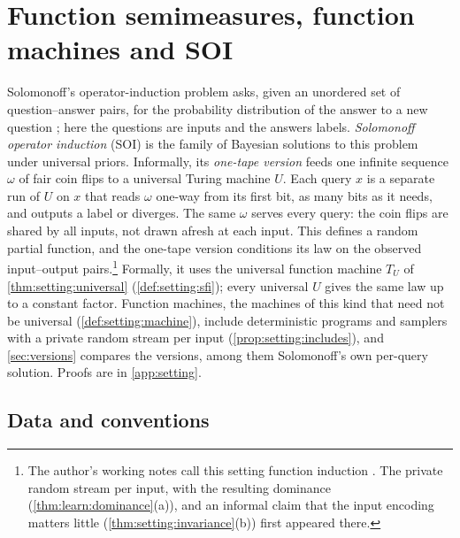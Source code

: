 \section{Function semimeasures, function machines and SOI}\label{sec:setting}

Solomonoff's operator-induction problem asks, given an unordered set of question--answer pairs, for the probability distribution of the answer to a new question \citep{solomonoff2008three}; here the questions are inputs and the answers labels. \emph{Solomonoff operator induction} (SOI) is the family of Bayesian solutions to this problem under universal priors. Informally, its \emph{one-tape version} feeds one infinite sequence $\omega$ of fair coin flips to a universal Turing machine $U$. Each query $x$ is a separate run of $U$ on $x$ that reads $\omega$ one-way from its first bit, as many bits as it needs, and outputs a label or diverges. The same $\omega$ serves every query: the coin flips are shared by all inputs, not drawn afresh at each input. This defines a random partial function, and the one-tape version conditions its law on the observed input--output pairs.\footnote{The author's working notes call this setting function induction \citep{hanni2026notes}. The private random stream per input, with the resulting dominance (\cref{thm:learn:dominance}(a)), and an informal claim that the input encoding matters little (\cref{thm:setting:invariance}(b)) first appeared there.} Formally, it uses the universal function machine $T_U$ of \cref{thm:setting:universal} (\cref{def:setting:sfi}); every universal $U$ gives the same law up to a constant factor. Function machines, the machines of this kind that need not be universal (\cref{def:setting:machine}), include deterministic programs and samplers with a private random stream per input (\cref{prop:setting:includes}), and \cref{sec:versions} compares the versions, among them Solomonoff's own per-query solution. Proofs are in \cref{app:setting}.

\subsection{Data and conventions}\label{sec:setting:data}

